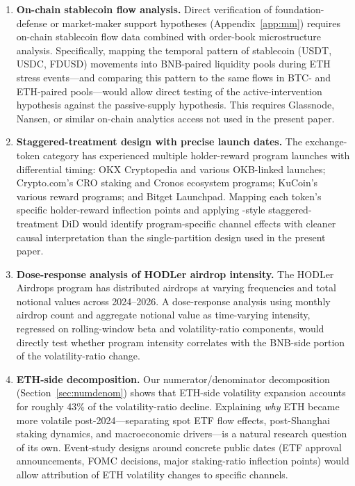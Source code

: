 \documentclass[11pt,a4paper]{article}
\begin{document}
\begin{enumerate}
\item \textbf{On-chain stablecoin flow analysis.} Direct verification of foundation-defense or market-maker support hypotheses (Appendix~\ref{app:mm}) requires on-chain stablecoin flow data combined with order-book microstructure analysis. Specifically, mapping the temporal pattern of stablecoin (USDT, USDC, FDUSD) movements into BNB-paired liquidity pools during ETH stress events---and comparing this pattern to the same flows in BTC- and ETH-paired pools---would allow direct testing of the active-intervention hypothesis against the passive-supply hypothesis. This requires Glassnode, Nansen, or similar on-chain analytics access not used in the present paper.

\item \textbf{Staggered-treatment design with precise launch dates.} The exchange-token category has experienced multiple holder-reward program launches with differential timing: OKX Cryptopedia and various OKB-linked launches; Crypto.com's CRO staking and Cronos ecosystem programs; KuCoin's various reward programs; and Bitget Launchpad. Mapping each token's specific holder-reward inflection points and applying \citet{callaway2021}-style staggered-treatment DiD would identify program-specific channel effects with cleaner causal interpretation than the single-partition design used in the present paper.

\item \textbf{Dose-response analysis of HODLer airdrop intensity.} The HODLer Airdrops program has distributed airdrops at varying frequencies and total notional values across 2024--2026. A dose-response analysis using monthly airdrop count and aggregate notional value as time-varying intensity, regressed on rolling-window beta and volatility-ratio components, would directly test whether program intensity correlates with the BNB-side portion of the volatility-ratio change.

\item \textbf{ETH-side decomposition.} Our numerator/denominator decomposition (Section~\ref{sec:numdenom}) shows that ETH-side volatility expansion accounts for roughly 43\% of the volatility-ratio decline. Explaining \emph{why} ETH became more volatile post-2024---separating spot ETF flow effects, post-Shanghai staking dynamics, and macroeconomic drivers---is a natural research question of its own. Event-study designs around concrete public dates (ETF approval announcements, FOMC decisions, major staking-ratio inflection points) would allow attribution of ETH volatility changes to specific channels.


\end{enumerate}
\end{document}
